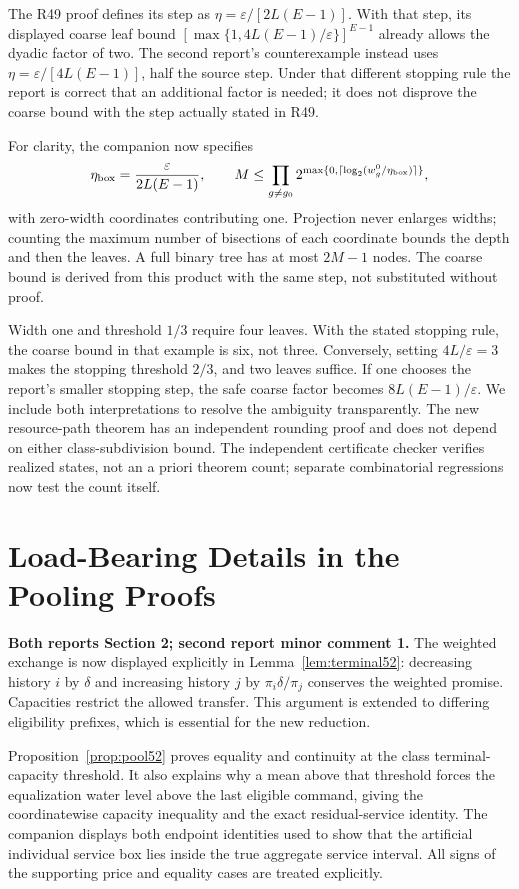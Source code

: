 The R49 proof defines its step as $\eta=\varepsilon/[2L(E-1)]$. With that step, its displayed coarse leaf bound $[\max\{1,4L(E-1)/\varepsilon\}]^{E-1}$ already allows the dyadic factor of two. The second report's counterexample instead uses $\eta=\varepsilon/[4L(E-1)]$, half the source step. Under that different stopping rule the report is correct that an additional factor is needed; it does not disprove the coarse bound with the step actually stated in R49.

For clarity, the companion now specifies
\[
 \eta_{\rm box}=\frac{\varepsilon}{2L(E-1)},\qquad
 M\leq\prod_{g\ne g_0}2^{\max\{0,\lceil\log_2(w_g^0/\eta_{\rm box})\rceil\}},
\]
with zero-width coordinates contributing one. Projection never enlarges widths; counting the maximum number of bisections of each coordinate bounds the depth and then the leaves. A full binary tree has at most $2M-1$ nodes. The coarse bound is derived from this product with the same step, not substituted without proof.

Width one and threshold $1/3$ require four leaves. With the stated stopping rule, the coarse bound in that example is six, not three. Conversely, setting $4L/\varepsilon=3$ makes the stopping threshold $2/3$, and two leaves suffice. If one chooses the report's smaller stopping step, the safe coarse factor becomes $8L(E-1)/\varepsilon$. We include both interpretations to resolve the ambiguity transparently. The new resource-path theorem has an independent rounding proof and does not depend on either class-subdivision bound. The independent certificate checker verifies realized states, not an a priori theorem count; separate combinatorial regressions now test the count itself.

\section{Load-Bearing Details in the Pooling Proofs}
\textbf{Both reports Section 2; second report minor comment 1.}
The weighted exchange is now displayed explicitly in Lemma~\ref{lem:terminal52}: decreasing history $i$ by $\delta$ and increasing history $j$ by $\pi_i\delta/\pi_j$ conserves the weighted promise. Capacities restrict the allowed transfer. This argument is extended to differing eligibility prefixes, which is essential for the new reduction.

Proposition~\ref{prop:pool52} proves equality and continuity at the class terminal-capacity threshold. It also explains why a mean above that threshold forces the equalization water level above the last eligible command, giving the coordinatewise capacity inequality and the exact residual-service identity. The companion displays both endpoint identities used to show that the artificial individual service box lies inside the true aggregate service interval. All signs of the supporting price and equality cases are treated explicitly.

